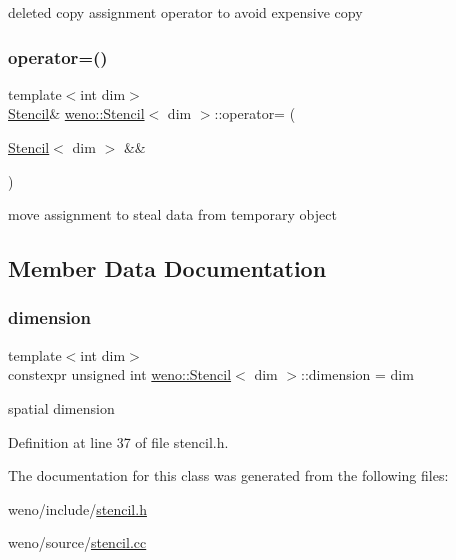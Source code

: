 deleted copy assignment operator to avoid expensive copy 

\mbox{\label{classweno_1_1_stencil_aa336788a2665ff4dde40bf0dd853a9aa}} 
\subsubsection{\texorpdfstring{operator=()}{operator=()}\hspace{0.1cm}{\footnotesize\ttfamily [2/2]}}
{\footnotesize\ttfamily template$<$int dim$>$ \\
\hyperlink{classweno_1_1_stencil}{Stencil}\& \hyperlink{classweno_1_1_stencil}{weno\+::\+Stencil}$<$ dim $>$\+::operator= (\begin{DoxyParamCaption}\item[{\hyperlink{classweno_1_1_stencil}{Stencil}$<$ dim $>$ \&\&}]{ }\end{DoxyParamCaption})\hspace{0.3cm}{\ttfamily [default]}}



move assignment to steal data from temporary object 



\subsection{Member Data Documentation}
\mbox{\label{classweno_1_1_stencil_a975242f28442f0358abc294910eb1d7b}} 
\subsubsection{\texorpdfstring{dimension}{dimension}}
{\footnotesize\ttfamily template$<$int dim$>$ \\
constexpr unsigned int \hyperlink{classweno_1_1_stencil}{weno\+::\+Stencil}$<$ dim $>$\+::dimension = dim\hspace{0.3cm}{\ttfamily [static]}}



spatial dimension 



Definition at line 37 of file stencil.\+h.



The documentation for this class was generated from the following files\+:\begin{DoxyCompactItemize}
\item 
weno/include/\hyperlink{stencil_8h}{stencil.\+h}\item 
weno/source/\hyperlink{stencil_8cc}{stencil.\+cc}\end{DoxyCompactItemize}
